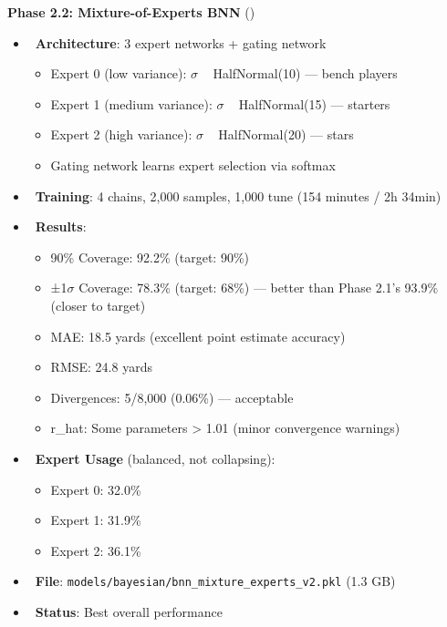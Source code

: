 \textbf{Phase 2.2: Mixture-of-Experts BNN} (\done)
\begin{itemize}
  \item \done\ \textbf{Architecture}: 3 expert networks + gating network
  \begin{itemize}
    \item Expert 0 (low variance): $\sigma$ ~ HalfNormal(10) — bench players
    \item Expert 1 (medium variance): $\sigma$ ~ HalfNormal(15) — starters
    \item Expert 2 (high variance): $\sigma$ ~ HalfNormal(20) — stars
    \item Gating network learns expert selection via softmax
  \end{itemize}
  \item \done\ \textbf{Training}: 4 chains, 2,000 samples, 1,000 tune (154 minutes / 2h 34min)
  \item \done\ \textbf{Results}:
  \begin{itemize}
    \item 90\% Coverage: 92.2\% (target: 90\%)
    \item ±1$\sigma$ Coverage: 78.3\% (target: 68\%) — better than Phase 2.1's 93.9\% (closer to target)
    \item MAE: 18.5 yards (excellent point estimate accuracy)
    \item RMSE: 24.8 yards
    \item Divergences: 5/8,000 (0.06\%) — acceptable
    \item r\_hat: Some parameters > 1.01 (minor convergence warnings)
  \end{itemize}
  \item \done\ \textbf{Expert Usage} (balanced, not collapsing):
  \begin{itemize}
    \item Expert 0: 32.0\%
    \item Expert 1: 31.9\%
    \item Expert 2: 36.1\%
  \end{itemize}
  \item \done\ \textbf{File}: \texttt{models/bayesian/bnn\_mixture\_experts\_v2.pkl} (1.3 GB)
  \item \done\ \textbf{Status}: \checkmark Best overall performance
\end{itemize}

